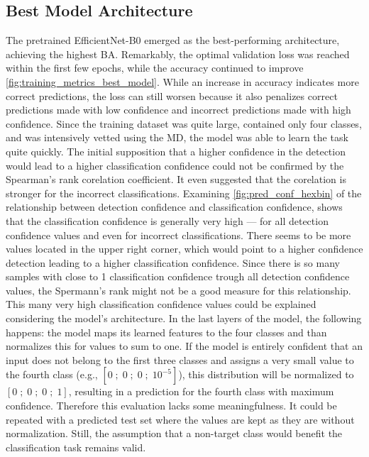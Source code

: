 \subsection{Best Model Architecture}
The pretrained EfficientNet-B0 emerged as the best-performing architecture, achieving the highest \ac{BA}.
Remarkably, the optimal validation loss was reached within the first few epochs, while the accuracy continued to improve \autoref{fig:training_metrics_best_model}.
While an increase in accuracy indicates more correct predictions, the loss can still worsen because it also penalizes correct predictions made with low confidence and incorrect predictions made with high confidence.
Since the training dataset was quite large, contained only four classes, and was intensively vetted using the \ac{MD}, the model was able to learn the task quite quickly.
The initial supposition that a higher confidence in the detection would lead to a higher classification confidence could not be confirmed by the Spearman's rank corelation coefficient.
It even suggested that the corelation is stronger for the incorrect classifications.
Examining \autoref{fig:pred_conf_hexbin} of the relationship between detection confidence and classification confidence, shows that the classification confidence is generally very high --- for all detection confidence values and even for incorrect classifications.
There seems to be more values located in the upper right corner, which would point to a higher confidence detection leading to a higher classification confidence.
Since there is so many samples with close to 1 classification confidence trough all detection confidence values, the Spermann's rank might not be a good measure for this relationship.
This many very high classification confidence values could be explained considering the model's architecture.
In the last layers of the model, the following happens: the model maps its learned features to the four classes and than normalizes this for values to sum to one.
If the model is entirely confident that an input does not belong to the first three classes and assigns a very small value to the fourth class (e.g., $[0\;;\;0\;;\;0\;;\;10^{-5}]$), this distribution will be normalized to $[0\;;\;0\;;\;0\;;\;1]$, resulting in a prediction for the fourth class with maximum confidence.
Therefore this evaluation lacks some meaningfulness.
It could be repeated with a predicted test set where the values are kept as they are without normalization.
Still, the assumption that a non-target class would benefit the classification task remains valid.

